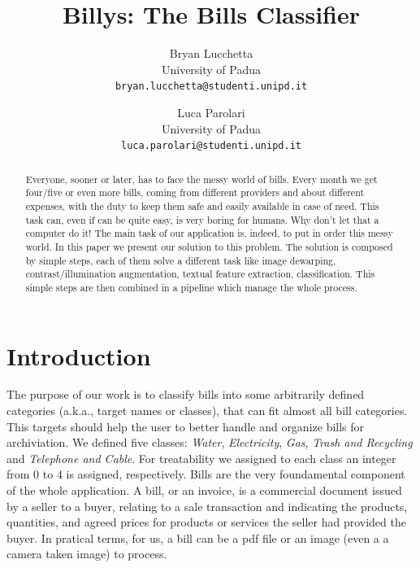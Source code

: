 \documentclass[10pt,twocolumn,letterpaper]{article}
\begin{document}
\title{Billys: The Bills Classifier}

\author{Bryan Lucchetta\\
{\small University of Padua}\\
{\tt\small bryan.lucchetta@studenti.unipd.it}
\and
Luca Parolari\\
{\small University of Padua}\\
{\tt\small luca.parolari@studenti.unipd.it}
}

\maketitle


\begin{abstract}
Everyone, sooner or later, has to face the messy world of bills. Every
month we get four/five or even more bills, coming from different
providers and about different expenses, with the duty to keep them
safe and easily available in case of need. This task can, even if can
be quite easy, is very boring for humans. Why don't let that a
computer do it! The main task of our application is, indeed, to put in
order this messy world.  In this paper we present our solution to this
problem. The solution is composed by simple steps, each of them solve
a different task like image dewarping, contrast/illumination
augmentation, textual feature extraction, classification. This simple
steps are then combined in a pipeline which manage the whole process.
\end{abstract}


\section{Introduction}

The purpose of our work is to classify bills into some arbitrarily
defined categories (a.k.a., target names or classes), that can
fit almost all bill categories. This targets should help the user to
better handle and organize bills for archiviation. We defined five
classes: \emph{Water}, \emph{Electricity}, \emph{Gas}, \emph{Trash and
  Recycling} and \emph{Telephone and Cable}. For treatability we
assigned to each class an integer from $0$ to $4$ is assigned,
respectively. Bills are the very foundamental component of the whole
application. A bill, or an invoice, is a commercial document issued by
a seller to a buyer, relating to a sale transaction and indicating the
products, quantities, and agreed prices for products or services the
seller had provided the buyer. In pratical terms, for us, a bill can
be a pdf file or an image (even a a camera taken image) to process.
\end{document}
